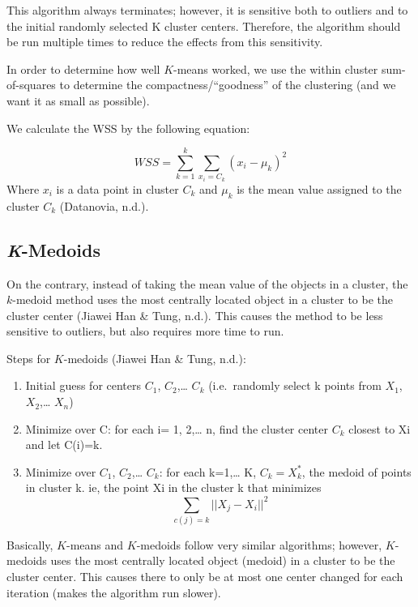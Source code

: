 \documentclass[12pt,twoside]{amherstthesis}
\begin{document}
  This algorithm always terminates; however, it is sensitive both to
  outliers and to the initial randomly selected K cluster centers.
  Therefore, the algorithm should be run multiple times to reduce the
  effects from this sensitivity.
  
  In order to determine how well \(K\)-means worked, we use the within
  cluster sum-of-squares to determine the compactness/``goodness'' of the
  clustering (and we want it as small as possible).
  
  We calculate the WSS by the following equation:
  
  \[WSS = \sum_{k=1}^k \sum_{x_i=C_k} ({{x_i- \mu_k}})^2\] Where \(x_i\)
  is a data point in cluster \(C_k\) and \(\mu_k\) is the mean value
  assigned to the cluster \(C_k\) (Datanovia, n.d.).
  
  \subsection{\texorpdfstring{\emph{K}-Medoids}{K-Medoids}}\label{k-medoids}
  
  On the contrary, instead of taking the mean value of the objects in a
  cluster, the \(k\)-medoid method uses the most centrally located object
  in a cluster to be the cluster center (Jiawei Han \& Tung, n.d.). This
  causes the method to be less sensitive to outliers, but also requires
  more time to run.
  
  Steps for \(K\)-medoids (Jiawei Han \& Tung, n.d.):
  
  \begin{enumerate}
  \def\labelenumi{\arabic{enumi}.}
  \item
    Initial guess for centers \(C_1\), \(C_2\),\ldots{} \(C_k\)
    (i.e.~randomly select k points from \(X_1\), \(X_2\),\ldots{} \(X_n\))
  \item
    Minimize over C: for each i= 1, 2,\ldots{} n, find the cluster center
    \(C_k\) closest to Xi and let C(i)=k.
  \item
    Minimize over \(C_1\), \(C_2\),\ldots{} \(C_k\): for each k=1,\ldots{}
    K, \(C_k = X_k^*\), the medoid of points in cluster k. ie, the point
    Xi in the cluster k that minimizes
    \[\sum  _{c(j)=k} ||{{X_j- X_i}}||^2\]
  \end{enumerate}
  
  Basically, \(K\)-means and \(K\)-medoids follow very similar algorithms;
  however, \(K\)-medoids uses the most centrally located object (medoid)
  in a cluster to be the cluster center. This causes there to only be at
  most one center changed for each iteration (makes the algorithm run
  slower).
  
\end{document}
